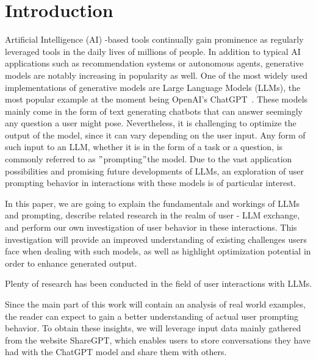 
\section{Introduction}
\label{sec:introduction}

\sloppy %
Artificial Intelligence (AI) -based tools continually gain prominence as regularly leveraged tools in the
daily lives of millions of people.
In addition to typical AI applications such as recommendation systems or autonomous agents, generative
models are notably increasing in popularity as well.
One of the most widely used implementations of generative models are Large Language Models (LLMs),
the most popular example at the moment being OpenAI's ChatGPT~\cite{openai_chatgpt_2023}.
These models mainly come in the form of text generating chatbots that can answer seemingly any question
a user might pose.
Nevertheless, it is challenging to optimize the output of the model, since it can vary depending
on the user input. %
Any form of such input to an LLM, whether it is in the form of a task or a question, is commonly
referred to as \("\)prompting\("\)the model.
Due to the vast application possibilities and promising future developments of LLMs,
an exploration of user prompting behavior in interactions with these models is of particular interest.

In this paper, we are going to explain the fundamentals and workings of LLMs and prompting,
describe related research in the realm of user - LLM exchange, and perform our own investigation of
user behavior in these interactions.
This investigation will provide an improved understanding of existing challenges users face when
dealing with such models, as well as highlight optimization potential in order to enhance generated
output.

Plenty of research has been conducted in the field of user interactions with LLMs.

Since the main part of this work will contain an analysis of real world examples, the reader can
expect to gain a better understanding of actual user prompting behavior.
To obtain these insights, we will leverage input data mainly gathered from the website
ShareGPT, %
which enables users to store conversations they have had with the ChatGPT model and share them
with others.

